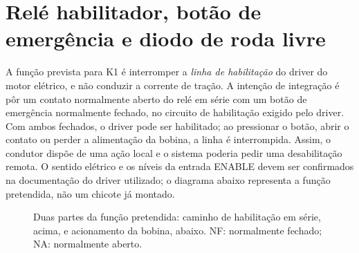 \section{Relé habilitador, botão de emergência e diodo de roda livre}
A função prevista para K1 é interromper a \emph{linha de habilitação} do driver do motor elétrico, e não conduzir a corrente de tração. A intenção de integração é pôr um contato normalmente aberto do relé em série com um botão de emergência normalmente fechado, no circuito de habilitação exigido pelo driver. Com ambos fechados, o driver pode ser habilitado; ao pressionar o botão, abrir o contato ou perder a alimentação da bobina, a linha é interrompida. Assim, o condutor dispõe de uma ação local e o sistema poderia pedir uma desabilitação remota. O sentido elétrico e os níveis da entrada ENABLE devem ser confirmados na documentação do driver utilizado; o diagrama abaixo representa a função pretendida, não um chicote já montado.

\begin{figure}[htbp]\centering
{}
\caption{Duas partes da função pretendida: caminho de habilitação em série, acima, e acionamento da bobina, abaixo. NF: normalmente fechado; NA: normalmente aberto.}\label{fig:rele-habilitador}
\end{figure}

